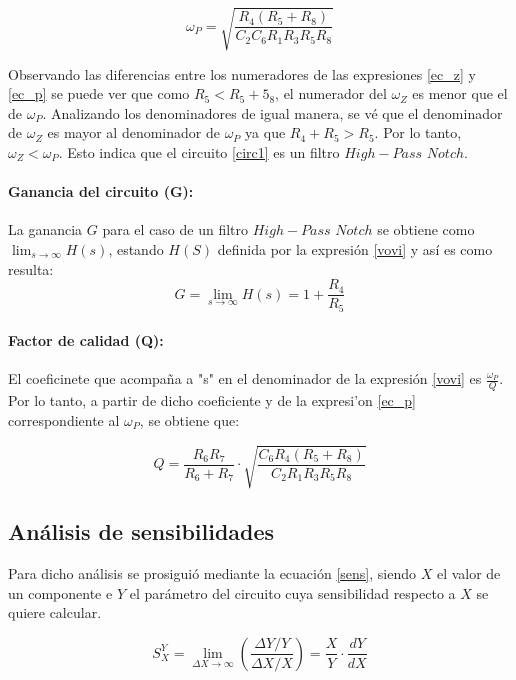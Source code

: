 \begin{equation}
\omega_P = \sqrt{\frac{R_4 (R_5 + R_8)}{C_2 C_6 R_1 R_3 R_5 R_8}}
\label{ec_p}
\end{equation}

Observando las diferencias entre los numeradores de las expresiones \ref{ec_z} y \ref{ec_p} se puede ver que como $R_5 < R_5 + 5_8$, el numerador del $\omega_Z$ es menor que el de $\omega_P$. Analizando los denominadores de igual manera, se v\'e que el denominador de $\omega_Z$ es mayor al denominador de $\omega_P$ ya que $R_4 + R_5 > R_5$. Por lo tanto, $\omega_Z < \omega_P$. Esto indica que el circuito \ref{circ1} es un filtro $High-Pass$ $ Notch$.


\paragraph*{Ganancia del circuito (G):}  La ganancia $G$ para el caso de un filtro $High-Pass$ $ Notch$ se obtiene como $\lim_{s\to\infty}H(s)$, estando $H(S)$ definida por la expresi\'on \ref{vovi} y as\'i es como resulta:
\begin{equation}
G = \lim_{s\to\infty}H(s) = 1 + \frac{R_4}{R_5} 
\label{G}
\end{equation}

\paragraph*{Factor de calidad (Q):} El coeficinete que acompa\~na a "s" en el denominador de la expresi\'on \ref{vovi} es $\frac{\omega_P}{Q}$. Por lo tanto, a partir de dicho coeficiente y de la expresi'on \ref{ec_p} correspondiente al $\omega_P$, se obtiene que:

\begin{equation}
Q = \frac{R_{6} R_{7}}{R_{6} + R_{7}} \cdot \sqrt{\frac{C_{6} R_{4} \left(R_{5} + R_{8}\right)}{C_{2} R_{1} R_{3}R_{5} R_{8} }}
\end{equation}


\subsection{An\'alisis de sensibilidades}

Para dicho an\'alisis se prosigui\'o mediante la ecuaci\'on \ref{sens}, siendo $X$ el valor de un componente e $Y$ el par\'ametro del circuito cuya sensibilidad respecto a $X$ se quiere calcular.

\begin{equation}
S^{Y}_{X}= \lim_{\Delta X \to \infty} \left(\frac{\Delta Y / Y}{\Delta X / X}\right) = \frac{X}{Y}\cdot\frac{dY}{dX}
\label{sens}
\end{equation}

